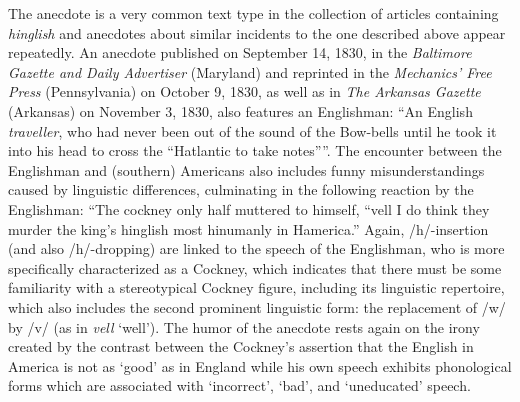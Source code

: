 The anecdote is a very common text type in the collection of articles containing \emph{hinglish} and anecdotes about similar incidents to the one described above appear repeatedly. An anecdote published on September 14, 1830, in the \emph{Baltimore Gazette and Daily Advertiser} (Maryland) and reprinted in the \emph{Mechanics' Free Press} (Pennsylvania) on October 9, 1830, as well as in \emph{The Arkansas Gazette} (Arkansas) on November 3, 1830, also features an Englishman: “An English \emph{traveller}, who had never been out of the sound of the Bow-bells until he took it into his head to cross the “Hatlantic to take notes””. The encounter between the Englishman and (southern) Americans also includes funny misunderstandings caused by linguistic differences, culminating in the following reaction by the Englishman: “The cockney only half muttered to himself, “vell I do think they murder the king’s hinglish most hinumanly in Hamerica.” Again, /h/-insertion (and also /h/\--dropping) are linked to the speech of the Englishman, who is more specifically characterized as a Cockney, which indicates that there must be some familiarity with a stereotypical Cockney figure, including its linguistic repertoire, which also includes the second prominent linguistic form: the replacement of /w/ by /v/ (as in \emph{vell} ‘well’). The humor of the anecdote rests again on the irony created by the contrast between the Cockney’s assertion that the English in America is not as ‘good’ as in England while his own speech exhibits phonological forms which are associated with ‘incorrect’, ‘bad’, and ‘uneducated’ speech.

